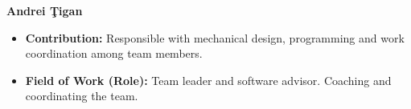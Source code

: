 \item[] \textbf{Andrei \c{T}igan}
    \begin{itemize}[label=]
        \item[\faEdit] \textbf{Contribution:} Responsible with mechanical design, programming and work coordination among team members.
        \item[\faMicroscope] \textbf{Field of Work (Role):} Team leader and software advisor. Coaching and coordinating the team.
    \end{itemize}
    \vspace{0.2 cm}
    